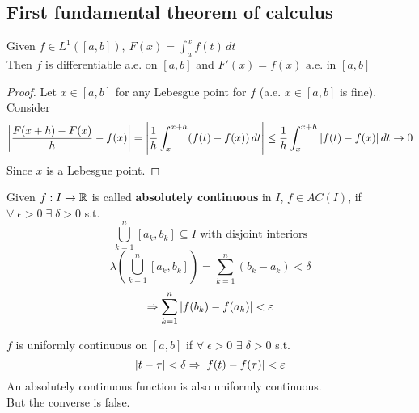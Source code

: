 \subsection{First fundamental theorem of calculus}
\begin{theorem}
Given \(f \in L^1([a,b]),\ F(x) = \int_a^xf(t) \, dt\) \\
Then \(f\) is differentiable a.e. on \([a,b]\) and \(F'(x) = f(x) \text{ a.e. in } [a,b]\)    
\end{theorem}
\begin{proof}
    Let \(x \in [a,b]\) for any Lebesgue point for \(f\) (a.e. \(x \in [a,b]\) is fine). Consider
    \[
        \left|{\frac{F(x+h)-F(x)}{h} - f(x)}\right| = \abs{\frac{1}{h} \int_x^{x+h} (f(t) - f(x)) \,dt } \leq \frac{1}{h} \int_x^{x+h} |f(t) - f(x)| \,dt \to 0 
    \]
    Since \(x\) is a Lebesgue point.
\end{proof}
\begin{definition}
    Given \(f : I \to \mathbb{R}\) is called \textbf{absolutely continuous} in \(I\), \(f \in AC(I)\), if \(\forall \; \epsilon >0 \; \exists \; \delta >0\)  
    s.t. 
    \[
        \bigcup_{k=1}^n [a_k, b_k] \subseteq I \text{ with disjoint interiors}
    \] 
    \[
        \lambda(\bigcup_{k=1}^n [a_k, b_k]) = \sum_{k=1}^n (b_k -a_k) < \delta
    \]
    \[
        \Rightarrow \sum_{k=1}^n \abs{f(b_k)-f(a_k)} < \varepsilon
    \]
\end{definition}
\begin{remark}
    \(f\) is uniformly continuous on \([a,b]\) if \(\forall \; \epsilon > 0\) \(\exists \; \delta > 0\) s.t. 
    \[
        \abs{t - \tau} < \delta \Rightarrow \abs{f(t)-f(\tau)} < \varepsilon
    \]
    An absolutely continuous function is also uniformly continuous. \\
    But the converse is false.
\end{remark}

